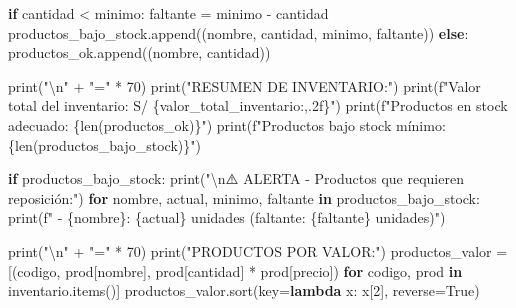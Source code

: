 \documentclass[
  doc,
  floatsintext,
  longtable,
  a4paper,
  nolmodern,
  notxfonts,
  notimes,
  12pt,
  colorlinks=true,linkcolor=blue,citecolor=blue,urlcolor=blue]{apa7}
\newenvironment{Shaded}{\begin{snugshade}}{\end{snugshade}}
\newcommand{\BuiltInTok}[1]{\textcolor[rgb]{0.00,0.23,0.31}{#1}}
\newcommand{\CharTok}[1]{\textcolor[rgb]{0.13,0.47,0.30}{#1}}
\newcommand{\ControlFlowTok}[1]{\textcolor[rgb]{0.00,0.23,0.31}{\textbf{#1}}}
\newcommand{\DecValTok}[1]{\textcolor[rgb]{0.68,0.00,0.00}{#1}}
\newcommand{\KeywordTok}[1]{\textcolor[rgb]{0.00,0.23,0.31}{\textbf{#1}}}
\newcommand{\NormalTok}[1]{\textcolor[rgb]{0.00,0.23,0.31}{#1}}
\newcommand{\OperatorTok}[1]{\textcolor[rgb]{0.37,0.37,0.37}{#1}}
\newcommand{\SpecialCharTok}[1]{\textcolor[rgb]{0.37,0.37,0.37}{#1}}
\newcommand{\SpecialStringTok}[1]{\textcolor[rgb]{0.13,0.47,0.30}{#1}}
\newcommand{\StringTok}[1]{\textcolor[rgb]{0.13,0.47,0.30}{#1}}
\newcommand{\VariableTok}[1]{\textcolor[rgb]{0.07,0.07,0.07}{#1}}
\begin{document}
\begin{Shaded}
\begin{Highlighting}[]
    \ControlFlowTok{if}\NormalTok{ cantidad }\OperatorTok{\textless{}}\NormalTok{ minimo:}
\NormalTok{        faltante }\OperatorTok{=}\NormalTok{ minimo }\OperatorTok{{-}}\NormalTok{ cantidad}
\NormalTok{        productos\_bajo\_stock.append((nombre, cantidad, minimo, faltante))}
    \ControlFlowTok{else}\NormalTok{:}
\NormalTok{        productos\_ok.append((nombre, cantidad))}

\BuiltInTok{print}\NormalTok{(}\StringTok{"}\CharTok{\textbackslash{}n}\StringTok{"} \OperatorTok{+} \StringTok{"="} \OperatorTok{*} \DecValTok{70}\NormalTok{)}
\BuiltInTok{print}\NormalTok{(}\StringTok{"RESUMEN DE INVENTARIO:"}\NormalTok{)}
\BuiltInTok{print}\NormalTok{(}\SpecialStringTok{f"Valor total del inventario: S/ }\SpecialCharTok{\{}\NormalTok{valor\_total\_inventario}\SpecialCharTok{:,.2f\}}\SpecialStringTok{"}\NormalTok{)}
\BuiltInTok{print}\NormalTok{(}\SpecialStringTok{f"Productos en stock adecuado: }\SpecialCharTok{\{}\BuiltInTok{len}\NormalTok{(productos\_ok)}\SpecialCharTok{\}}\SpecialStringTok{"}\NormalTok{)}
\BuiltInTok{print}\NormalTok{(}\SpecialStringTok{f"Productos bajo stock mínimo: }\SpecialCharTok{\{}\BuiltInTok{len}\NormalTok{(productos\_bajo\_stock)}\SpecialCharTok{\}}\SpecialStringTok{"}\NormalTok{)}

\ControlFlowTok{if}\NormalTok{ productos\_bajo\_stock:}
    \BuiltInTok{print}\NormalTok{(}\StringTok{"}\CharTok{\textbackslash{}n}\StringTok{⚠️ ALERTA {-} Productos que requieren reposición:"}\NormalTok{)}
    \ControlFlowTok{for}\NormalTok{ nombre, actual, minimo, faltante }\KeywordTok{in}\NormalTok{ productos\_bajo\_stock:}
        \BuiltInTok{print}\NormalTok{(}\SpecialStringTok{f"  {-} }\SpecialCharTok{\{}\NormalTok{nombre}\SpecialCharTok{\}}\SpecialStringTok{: }\SpecialCharTok{\{}\NormalTok{actual}\SpecialCharTok{\}}\SpecialStringTok{ unidades (faltante: }\SpecialCharTok{\{}\NormalTok{faltante}\SpecialCharTok{\}}\SpecialStringTok{ unidades)"}\NormalTok{)}

\BuiltInTok{print}\NormalTok{(}\StringTok{"}\CharTok{\textbackslash{}n}\StringTok{"} \OperatorTok{+} \StringTok{"="} \OperatorTok{*} \DecValTok{70}\NormalTok{)}
\BuiltInTok{print}\NormalTok{(}\StringTok{"PRODUCTOS POR VALOR:"}\NormalTok{)}
\NormalTok{productos\_valor }\OperatorTok{=}\NormalTok{ [(codigo, prod[}\StringTok{\textquotesingle{}nombre\textquotesingle{}}\NormalTok{], prod[}\StringTok{\textquotesingle{}cantidad\textquotesingle{}}\NormalTok{] }\OperatorTok{*}\NormalTok{ prod[}\StringTok{\textquotesingle{}precio\textquotesingle{}}\NormalTok{]) }
                   \ControlFlowTok{for}\NormalTok{ codigo, prod }\KeywordTok{in}\NormalTok{ inventario.items()]}
\NormalTok{productos\_valor.sort(key}\OperatorTok{=}\KeywordTok{lambda}\NormalTok{ x: x[}\DecValTok{2}\NormalTok{], reverse}\OperatorTok{=}\VariableTok{True}\NormalTok{)}


\end{Highlighting}
\end{Shaded}
\end{document}

